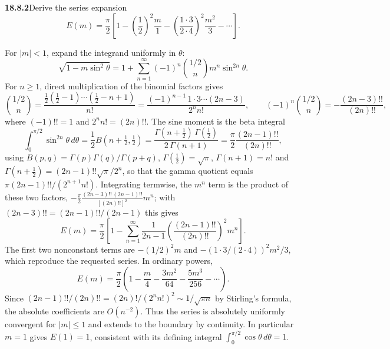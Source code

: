 \par\bigskip
\noindent\textbf{18.8.2}\quad Derive the series expansion
\[
E(m)=\frac{\pi}{2}\left[1-\left(\frac{1}{2}\right)^{2}
\frac{m}{1}-\left(\frac{1\cdot3}{2\cdot4}\right)^{2}
\frac{m^{2}}{3}-\cdots\right].
\]
\par\nobreak
\solution
For $|m|<1$, expand the integrand uniformly in $\theta$:
\[
\sqrt{1-m\sin^2\theta}
 =1+\sum_{n=1}^\infty(-1)^n\binom{1/2}{n}
                  m^n\sin^{2n}\theta.
\]
For $n\ge1$, direct multiplication of the binomial factors gives
\[
\binom{1/2}{n}
 =\frac{\frac12(\frac12-1)\cdots(\frac12-n+1)}{n!}
 =\frac{(-1)^{n-1}\,1\cdot3\cdots(2n-3)}{2^nn!},
\qquad
(-1)^n\binom{1/2}{n}=-\frac{(2n-3)!!}{(2n)!!},
\]
where $(-1)!!=1$ and $2^nn!=(2n)!!$.  The sine moment is the beta
integral
\[
\int_0^{\pi/2}\sin^{2n}\theta\,d\theta
 =\frac12B(n+\tfrac12,\tfrac12)
 =\frac{\Gamma(n+\frac12)\,\Gamma(\frac12)}{2\,\Gamma(n+1)}
 =\frac\pi2\frac{(2n-1)!!}{(2n)!!},
\]
using $B(p,q)=\Gamma(p)\Gamma(q)/\Gamma(p+q)$,
$\Gamma(\tfrac12)=\sqrt\pi$, $\Gamma(n+1)=n!$ and
$\Gamma(n+\tfrac12)=(2n-1)!!\sqrt\pi/2^n$, so that the gamma
quotient equals $\pi(2n-1)!!/(2^{n+1}n!)$.
Integrating termwise, the $m^n$ term is the product of these two
factors,
$-\frac\pi2\frac{(2n-3)!!\,(2n-1)!!}{[(2n)!!]^2}m^n$; with
$(2n-3)!!=(2n-1)!!/(2n-1)$ this gives
\[
\boxed{E(m)=\frac\pi2\left[
 1-\sum_{n=1}^\infty\frac1{2n-1}
       \left(\frac{(2n-1)!!}{(2n)!!}\right)^2m^n\right]}.
\]
The first two nonconstant terms are
$-(1/2)^2m$ and $-(1\cdot3/(2\cdot4))^2m^2/3$,
which reproduce the requested series.  In ordinary powers,
\[
E(m)=\frac\pi2\left(1-\frac m4-\frac{3m^2}{64}
                             -\frac{5m^3}{256}-\cdots\right).
\]
Since $(2n-1)!!/(2n)!!=(2n)!/(2^nn!)^2\sim1/\sqrt{\pi n}$ by
Stirling's formula, the absolute
coefficients are $O(n^{-2})$.  Thus the series is absolutely
uniformly convergent for $|m|\le1$ and extends to the boundary
by continuity.  In particular $m=1$ gives $E(1)=1$, consistent
with its defining integral $\int_0^{\pi/2}\cos\theta\,d\theta=1$.

